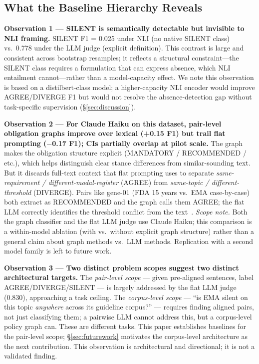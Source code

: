 \documentclass[manuscript]{acmart}
\begin{document}
\subsection{What the Baseline Hierarchy Reveals}

\textbf{Observation 1 --- SILENT is semantically detectable but invisible to
NLI framing.} SILENT F1 = 0.025 under NLI (no native SILENT class) vs.\ 0.778
under the LLM judge (explicit definition). This contrast is large and consistent
across bootstrap resamples; it reflects a structural constraint---the SILENT
class requires a formulation that can express absence, which NLI entailment
cannot---rather than a model-capacity effect. We note this observation is based
on a distilbert-class model; a higher-capacity NLI encoder would improve
AGREE/DIVERGE F1 but would not resolve the absence-detection gap without
task-specific supervision (\S\ref{sec:discussion}).

\textbf{Observation 2 --- For Claude Haiku on this dataset, pair-level
obligation graphs improve over lexical (+0.15 F1) but trail flat prompting
($-$0.17 F1); CIs partially overlap at pilot scale.} The graph makes the
obligation structure explicit (MANDATORY / RECOMMENDED / etc.), which helps
distinguish clear stance differences from similar-sounding text. But it
discards full-text context that flat prompting uses to separate
\textit{same-requirement / different-modal-register} (AGREE) from
\textit{same-topic / different-threshold} (DIVERGE). Pairs like gene-01 (FDA
15 years vs.\ EMA case-by-case) both extract as RECOMMENDED and the graph
calls them AGREE; the flat LLM correctly identifies the threshold conflict from
the text~\citep{qian2026evidenceforce}.
\textit{Scope note.} Both the graph classifier and the flat LLM judge use
Claude Haiku; this comparison is a within-model ablation (with vs.\ without
explicit graph structure) rather than a general claim about graph methods vs.\
LLM methods. Replication with a second model family is left to future work.

\textbf{Observation 3 --- Two distinct problem scopes suggest two distinct
architectural targets.} The \textit{pair-level scope} --- given pre-aligned
sentences, label AGREE/DIVERGE/SILENT --- is largely addressed by the flat
LLM judge (0.830), approaching a task ceiling. The \textit{corpus-level scope}
--- ``is EMA silent on this topic \textit{anywhere} across its guideline
corpus?'' --- requires finding aligned pairs, not just classifying them; a
pairwise LLM cannot address this, but a corpus-level policy graph can. These
are different tasks. This paper establishes baselines for the pair-level scope;
\S\ref{sec:futurework} motivates the corpus-level architecture as the next
contribution. This observation is architectural and directional; it is not a
validated finding.
\end{document}
